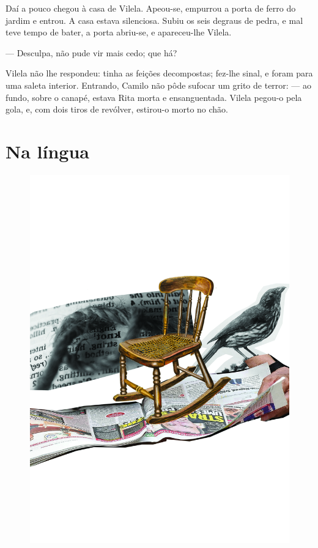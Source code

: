 Daí a pouco chegou à casa de Vilela. Apeou-se, empurrou a porta de ferro
do jardim e entrou. A casa estava silenciosa. Subiu os seis degraus de
pedra, e mal teve tempo de bater, a porta abriu-se, e apareceu-lhe
Vilela.

--- Desculpa, não pude vir mais cedo; que há?

Vilela não lhe respondeu: tinha as feições decompostas; fez-lhe sinal, e
foram para uma saleta interior. Entrando, Camilo não pôde sufocar um
grito de terror: --- ao fundo, sobre o canapé, estava Rita morta e
ensanguentada. Vilela pegou-o pela gola, e, com dois tiros de revólver,
estirou-o morto no chão.

\part{Na língua}

\pagebreak
\thispagestyle{empty}
\begin{figure}
\includegraphics[width=\textwidth]{./ilustracoes/14_PLEBISCITO.jpg}
\end{figure}
\pagebreak

